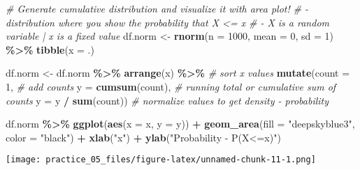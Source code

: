 \documentclass[
]{article}
\newenvironment{Shaded}{\begin{snugshade}}{\end{snugshade}}
\newcommand{\AttributeTok}[1]{\textcolor[rgb]{0.13,0.29,0.53}{#1}}
\newcommand{\CommentTok}[1]{\textcolor[rgb]{0.56,0.35,0.01}{\textit{#1}}}
\newcommand{\DecValTok}[1]{\textcolor[rgb]{0.00,0.00,0.81}{#1}}
\newcommand{\FunctionTok}[1]{\textcolor[rgb]{0.13,0.29,0.53}{\textbf{#1}}}
\newcommand{\NormalTok}[1]{#1}
\newcommand{\OtherTok}[1]{\textcolor[rgb]{0.56,0.35,0.01}{#1}}
\newcommand{\SpecialCharTok}[1]{\textcolor[rgb]{0.81,0.36,0.00}{\textbf{#1}}}
\newcommand{\StringTok}[1]{\textcolor[rgb]{0.31,0.60,0.02}{#1}}
\begin{document}
\begin{Shaded}
\begin{Highlighting}[]
\CommentTok{\# Generate cumulative distribution and visualize it with area plot!}
\CommentTok{\# {-} distribution where you show the probability that X \textless{}= x}
\CommentTok{\# {-} X is a random variable | x is a fixed value}
\NormalTok{df.norm }\OtherTok{\textless{}{-}} \FunctionTok{rnorm}\NormalTok{(}\AttributeTok{n =} \DecValTok{1000}\NormalTok{, }\AttributeTok{mean =} \DecValTok{0}\NormalTok{, }\AttributeTok{sd =} \DecValTok{1}\NormalTok{) }\SpecialCharTok{\%\textgreater{}\%} 
  \FunctionTok{tibble}\NormalTok{(}\AttributeTok{x =}\NormalTok{ .)}

\NormalTok{df.norm }\OtherTok{\textless{}{-}}\NormalTok{ df.norm }\SpecialCharTok{\%\textgreater{}\%} 
  \FunctionTok{arrange}\NormalTok{(x) }\SpecialCharTok{\%\textgreater{}\%}    \CommentTok{\# sort x values}
  \FunctionTok{mutate}\NormalTok{(}\AttributeTok{count =} \DecValTok{1}\NormalTok{, }\CommentTok{\# add counts}
         \AttributeTok{y =} \FunctionTok{cumsum}\NormalTok{(count),  }\CommentTok{\# running total or cumulative sum of counts}
         \AttributeTok{y =}\NormalTok{ y }\SpecialCharTok{/} \FunctionTok{sum}\NormalTok{(count)) }\CommentTok{\# normalize values to get density {-} probability }
  
\NormalTok{df.norm }\SpecialCharTok{\%\textgreater{}\%} 
  \FunctionTok{ggplot}\NormalTok{(}\FunctionTok{aes}\NormalTok{(}\AttributeTok{x =}\NormalTok{ x,}
             \AttributeTok{y =}\NormalTok{ y)) }\SpecialCharTok{+}
  \FunctionTok{geom\_area}\NormalTok{(}\AttributeTok{fill =} \StringTok{"deepskyblue3"}\NormalTok{, }
            \AttributeTok{color =} \StringTok{"black"}\NormalTok{) }\SpecialCharTok{+}
  \FunctionTok{xlab}\NormalTok{(}\StringTok{"x"}\NormalTok{) }\SpecialCharTok{+}
  \FunctionTok{ylab}\NormalTok{(}\StringTok{"Probability   {-}   P(X\textless{}=x)"}\NormalTok{)}
\end{Highlighting}
\end{Shaded}

\texttt{[image: practice\_05\_files/figure-latex/unnamed-chunk-11-1.png]}
\end{document}
